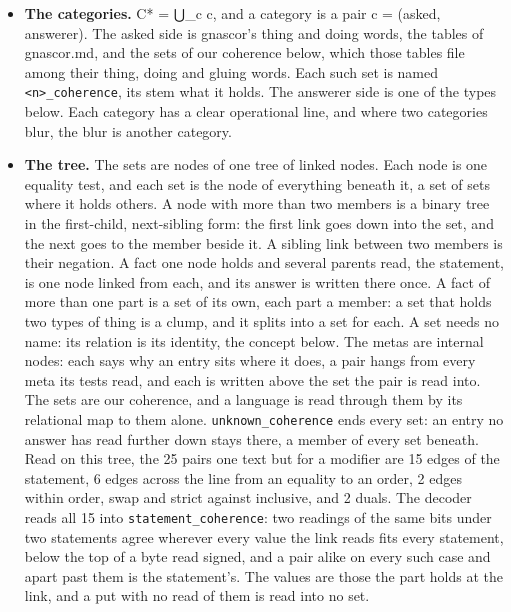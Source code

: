 \begin{itemize}
\item \textbf{The categories.} C* = ⋃\_\allowbreak{}c c, and a category is a pair c = (asked, answerer). The asked side is gnascor's thing and doing words, the tables of gnascor.md, and the sets of our coherence below, which those tables file among their thing, doing and gluing words. Each such set is named \texttt{<n>\_\allowbreak{}coherence}, its stem what it holds. The answerer side is one of the types below. Each category has a clear operational line, and where two categories blur, the blur is another category.
\item \textbf{The tree.} The sets are nodes of one tree of linked nodes. Each node is one equality test, and each set is the node of everything beneath it, a set of sets where it holds others. A node with more than two members is a binary tree in the first-child, next-sibling form: the first link goes down into the set, and the next goes to the member beside it. A sibling link between two members is their negation. A fact one node holds and several parents read, the statement, is one node linked from each, and its answer is written there once. A fact of more than one part is a set of its own, each part a member: a set that holds two types of thing is a clump, and it splits into a set for each. A set needs no name: its relation is its identity, the concept below. The metas are internal nodes: each says why an entry sits where it does, a pair hangs from every meta its tests read, and each is written above the set the pair is read into. The sets are our coherence, and a language is read through them by its relational map to them alone. \texttt{unknown\_\allowbreak{}coherence} ends every set: an entry no answer has read further down stays there, a member of every set beneath. Read on this tree, the 25 pairs one text but for a modifier are 15 edges of the statement, 6 edges across the line from an equality to an order, 2 edges within order, swap and strict against inclusive, and 2 duals. The decoder reads all 15 into \texttt{statement\_\allowbreak{}coherence}: two readings of the same bits under two statements agree wherever every value the link reads fits every statement, below the top of a byte read signed, and a pair alike on every such case and apart past them is the statement's. The values are those the part holds at the link, and a put with no read of them is read into no set.
\end{itemize}

